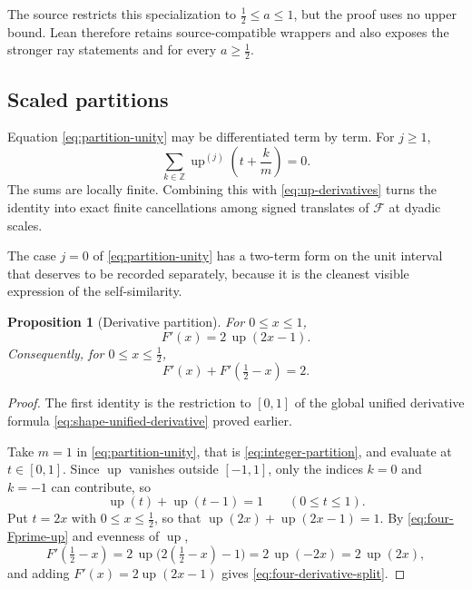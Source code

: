 \documentclass[11pt,oneside]{article}
\newtheorem{proposition}[theorem]{Proposition}
\theoremstyle{definition}
\theoremstyle{remark}
\newcommand{\Z}{\mathbb Z}
\newcommand{\Up}{\operatorname{up}}
\begin{document}
The source restricts this specialization to $\tfrac12\le a\le1$, but the proof uses no
upper bound.  Lean therefore retains source-compatible wrappers and also exposes the stronger
ray statements
 and
 for every $a\ge\tfrac12$.

\subsection{Scaled partitions}

Equation \eqref{eq:partition-unity} may be differentiated term by term.  For $j\ge1$,
\begin{equation}
 \sum_{k\in\Z}\Up^{(j)}\!\left(t+\frac{k}{m}\right)=0.    \label{eq:derivative-partition}
\end{equation}
The sums are locally finite.  Combining this with \eqref{eq:up-derivatives} turns the
identity into exact finite cancellations among signed translates of $\mathcal F$ at dyadic
scales.


The case $j=0$ of \eqref{eq:partition-unity} has a two-term form on the unit interval that
deserves to be recorded separately, because it is the cleanest visible expression of the
self-similarity.

\begin{proposition}[Derivative partition]
\label{prop:four-derivative-partition}
For $0\le x\le1$,
\begin{equation}
 F'(x)=2\,\Up(2x-1).                                       \label{eq:four-Fprime-up}
\end{equation}
Consequently, for $0\le x\le\tfrac12$,
\begin{equation}
 F'(x)+F'\!\left(\tfrac12-x\right)=2.                      \label{eq:four-derivative-split}
\end{equation}
\end{proposition}

\begin{proof}
The first identity is the restriction to $[0,1]$ of the global unified derivative formula
\eqref{eq:shape-unified-derivative} proved earlier.

Take $m=1$ in \eqref{eq:partition-unity}, that is \eqref{eq:integer-partition}, and evaluate
at $t\in[0,1]$.  Since $\Up$ vanishes outside $[-1,1]$, only the indices $k=0$ and $k=-1$
can contribute, so
\begin{equation}
 \Up(t)+\Up(t-1)=1\qquad(0\le t\le1).                      \label{eq:four-two-term-partition}
\end{equation}
Put $t=2x$ with $0\le x\le\tfrac12$, so that $\Up(2x)+\Up(2x-1)=1$.  By
\eqref{eq:four-Fprime-up} and evenness of $\Up$,
\begin{equation*}
 F'\!\left(\tfrac12-x\right)=2\,\Up\bigl(2(\tfrac12-x)-1\bigr)=2\,\Up(-2x)=2\,\Up(2x),
\end{equation*}
and adding $F'(x)=2\Up(2x-1)$ gives \eqref{eq:four-derivative-split}.
\end{proof}
\end{document}
